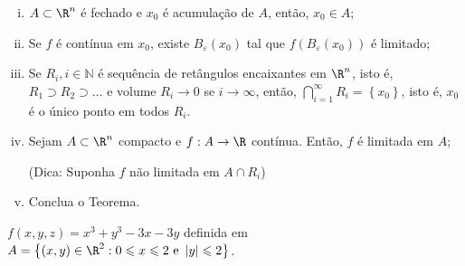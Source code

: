 \documentclass[11pt, oneside, a4paper]{gsm-l}
\begin{document}
\begin{dem}
\begin{enumerate}[(i)]
      \item $A \subset \R^n$ é fechado e $x_0$ é acumulação de $A$, então, $x_0 \in A$;
      \item Se $f$ é contínua em $x_0$, existe $B_\varepsilon  \left( {x_0 } \right)$ tal que $f\left( {B_\varepsilon  \left( {x_0 } \right)} \right)$ é limitado;
      \item Se $R_i ,i \in \mathbb{N}$ é sequ\^encia de ret\^angulos encaixantes em $\R^n$, isto é, $R_1  \supset R_2  \supset ...$ e volume $R_i  \to 0$ se $i \to \infty$, então, $\bigcap\limits_{i = 1}^\infty  {R_i }  = \left\{ {x_0 } \right\}$, isto é, $x_0$ é o \'unico ponto em todos $R_i$.
      \item Sejam $A \subset \R^n$ compacto e $f:A \to \R$ contínua. Então, $f$ é limitada em $A$;

(Dica: Suponha $f$ não limitada em $A \cap R_i$)
\item Conclua o Teorema.
\end{enumerate}
\end{dem}

\begin{exem}
$f\left( {x,y,z} \right) = x^3  + y^3  - 3x - 3y$ definida em \\
$A = \left\{ {\left( {x,y} \right) \in \R^2 :0 \leqslant x \leqslant 2{\text{ e }}\left| y \right| \leqslant 2} \right\}$.
\end{exem}
\end{document}
